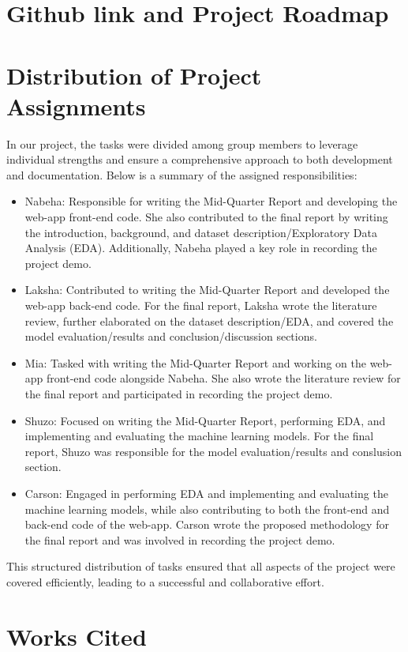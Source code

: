 \documentclass[times, twocolumn]{article}
\begin{document}
\section{Github link and Project Roadmap}

\section{Distribution of Project Assignments}
In our project, the tasks were divided among group members to leverage individual strengths and ensure a comprehensive approach to both development and documentation. Below is a summary of the assigned responsibilities:

\begin{itemize}
    \item Nabeha: Responsible for writing the Mid-Quarter Report and developing the web-app front-end code. She also contributed to the final report by writing the introduction, background, and dataset description/Exploratory Data Analysis (EDA). Additionally, Nabeha played a key role in recording the project demo.
    \item Laksha: Contributed to writing the Mid-Quarter Report and developed the web-app back-end code. For the final report, Laksha wrote the literature review, further elaborated on the dataset description/EDA, and covered the model evaluation/results and conclusion/discussion sections.
    \item Mia: Tasked with writing the Mid-Quarter Report and working on the web-app front-end code alongside Nabeha. She also wrote the literature review for the final report and participated in recording the project demo.
    \item Shuzo: Focused on writing the Mid-Quarter Report, performing EDA, and implementing and evaluating the machine learning models. For the final report, Shuzo was responsible for the model evaluation/results and conslusion section.
    \item Carson: Engaged in performing EDA and implementing and evaluating the machine learning models, while also contributing to both the front-end and back-end code of the web-app. Carson wrote the proposed methodology for the final report and was involved in recording the project demo.
\end{itemize}

This structured distribution of tasks ensured that all aspects of the project were covered efficiently, leading to a successful and collaborative effort.

\section{Works Cited}
\printbibliography
\end{document}
